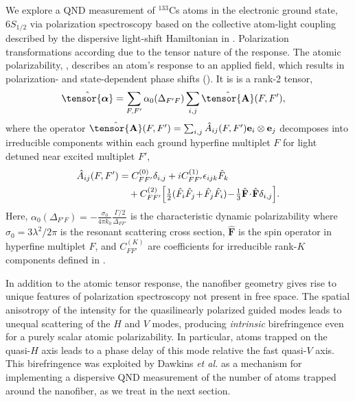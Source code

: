 \documentclass[aps,pra,twocolumn]{revtex4-1} %
\newcommand{\poltens}{\hat{\tensor{\boldsymbol{\alpha}}}}
\newcommand{\charpol}{\alpha_0(\Delta_{F'F})}
\begin{document}
We explore a QND measurement of ${}^{133}$Cs atoms in the electronic ground state, $6S_{1/2}$ via polarization spectroscopy based on the collective atom-light coupling described by the dispersive light-shift Hamiltonian in . Polarization transformations according due to the tensor nature of the response.  The atomic polarizability, , describes an atom's response to an applied field, which results in polarization- and state-dependent phase shifts ().  It is is a rank-2 tensor,
	\begin{align} \label{Eq::Polarizability}
		\poltens &=  \sum_{F,F'} \charpol \sum_{i,j} \hat{\tensor{\mbf{A}}}(F,F'),
	\end{align}
where the operator $\hat{\tensor{\mbf{A}}}(F,F') = \sum_{i,j} \hat{A}_{ij}(F,F')\mathbf{e}_i \otimes \mathbf{e}_j$ decomposes into irreducible components within each ground hyperfine multiplet $F$ for light detuned near excited multiplet $F'$,  
	\begin{align} \label{Eq::PolarizabilityIrrep}
		\hat{A}_{ij}(F,F')&=  C_{FF'}^{(0)} \delta_{i,j}+ iC_{FF'}^{(1)}\epsilon_{ijk}\hat{F}_k\nonumber\\
		&\quad+ C_{FF'}^{(2)} \Big[ \mbox{$\frac{1}{2}$} ( \hat{F}_i\hat{F}_j \!+\!\hat{F}_j\hat{F}_i )\!-\!\mbox{$\frac{1}{3}$} \hat{\mathbf{F}}\!\cdot\!\hat{\mathbf{F}} \delta_{i,j} \Big]. 
\end{align}
Here, $\charpol = -\frac{\sigma_0}{4\pi k_0}\frac{\Gamma/2 }{\Delta_{FF'}}$ is the characteristic dynamic polarizability where $\sigma_0 = 3 \lambda^2/2\pi$ is the resonant scattering cross section, $\hat{\mathbf{F}}$ is the spin operator in hyperfine multiplet $F$, and $C_{FF'}^{(K)}$ are coefficients for irreducible rank-$K$ components defined in \cite{deutsch_quantum_2010}. 

In addition to the atomic tensor response, the nanofiber geometry gives rise to unique features of polarization spectroscopy not present in free space.  The spatial anisotropy of the intensity for the quasilinearly polarized guided modes leads to unequal scattering of the $H$ and $V$ modes, producing \emph{intrinsic} birefringence even for a purely scalar atomic polarizability.  
In particular, atoms trapped on the quasi-$H$ axis leads to a phase delay of this mode relative the fast quasi-$V$ axis. 
This birefringence was exploited by Dawkins {\em et al.} \cite{dawkins_dispersive_2011} as a mechanism for implementing a dispersive QND measurement of the number of atoms trapped around the nanofiber, as we treat in the next section. 
\end{document}
